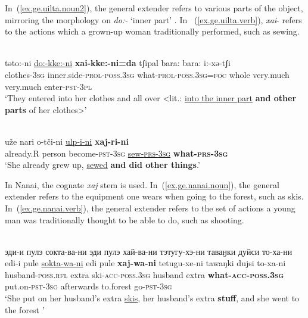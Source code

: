 \documentclass[output=paper,colorlinks,citecolor=brown
\ChapterDOI{10.5281/zenodo.15697577}
]{langscibook}
\begin{document}
In~(\ref{ex.ge.uilta.noun2}), the general extender refers to various parts of the object, mirroring the morphology on \textit{do:-} `inner part' . In~ (\ref{ex.ge.uilta.verb}), \textit{xai}- refers to the actions which a grown-up woman traditionally performed, such as sewing.

 \ea \label{ex.ge.uilta.noun2}
 \\
 \gll təto:-ni \uline{do:-kke:-ni} \textbf{xai-kke:-ni=da} tʃipal bara: bara: i:-xə-tʃi\\
clothes-\textsc{3sg} inner.side-\textsc{prol}-\textsc{poss.3sg} what-\textsc{prol}-\textsc{poss.3sg}=\textsc{foc} whole very.much very.much enter-\textsc{pst}-\textsc{3pl}\\
\glt `They entered into her clothes and all over <lit.: \uline{into the inner part} \textbf{and other parts} of her clothes>' \\
 \z
{} 


 \ea \label{ex.ge.uilta.verb}
 \\
\gll uže nari o-tči-ni \uline{ulp-i-ni} \textbf{xaj-ri-ni}\\
already.R person become-\textsc{pst}-\textsc{3sg} \uline{sew-\textsc{prs}-\textsc{3sg}} \textbf{what-\textsc{prs}-\textsc{3sg}}\\
\glt `She already grew up, \uline{sewed} \textbf{and did other things}.' \\
 \z
{} 


In Nanai, the cognate \textit{xaj} stem is used. In~(\ref{ex.ge.nanai.noun}), the general extender refers to the equipment one wears when going to the forest, such as skis. In~(\ref{ex.ge.nanai.verb}), the general extender refers to the set of actions a young man was traditionally thought to be able to do, such as shooting.


 \ea \label{ex.ge.nanai.noun}
 \\
\glll эди-и пулэ сокта-ва-ни эди пулэ хай-ва-ни тэтугу-хэ-ни таваӈки дуйси то-ха-ни\\
edi-i pule \uline{sokta-wa-ni} edi pule \textbf{xaj-wa-ni} tetugu-xe-ni tawaŋki dujsi to-xa-ni\\
husband-\textsc{poss.rfl} extra ski-\textsc{acc}-\textsc{poss.3sg} husband extra \textbf{what-\textsc{acc}-\textsc{poss.3sg}} put.on-\textsc{pst}-\textsc{3sg} afterwards to.forest go-\textsc{pst}-\textsc{3sg}\\
\glt `She put on her husband's extra \uline{skis}, her husband's extra \textbf{stuff}, and she went to the forest ' \\
 \z
{}
\end{document}
